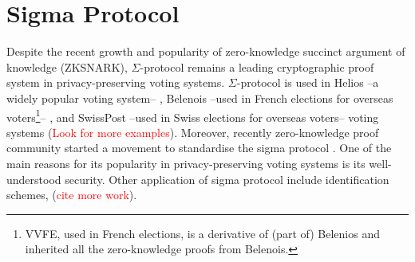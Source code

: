 \documentclass[conference,compsoc]{IEEEtran}
\begin{document}
\section{Sigma Protocol}\label{sigma_protocol}
Despite the recent growth and popularity of zero-knowledge succinct 
argument of knowledge (ZKSNARK), $\Sigma$-protocol remains a
leading cryptographic proof system in privacy-preserving voting systems. 
$\Sigma$-protocol is used in Helios --a widely popular voting system-- \cite{adida2008helios}, 
Belenois --used in French elections for overseas 
voters\footnote{VVFE, used in French elections, is a derivative of (part of) Belenios and 
inherited all the zero-knowledge proofs from Belenois.}-- \cite{cortier2023french}, and 
SwissPost --used in Swiss elections for overseas voters-- voting 
systems \cite{10.1007/978-3-031-15911-4_4} (\textcolor{red}{Look for more examples}). 
Moreover, recently zero-knowledge proof community started a movement to standardise
the sigma protocol \cite{ZKProof}.
One of the main reasons for its popularity in privacy-preserving voting systems is its
well-understood security.  Other application of sigma protocol 
include identification schemes, (\textcolor{red}{cite more work}). 
\end{document}
